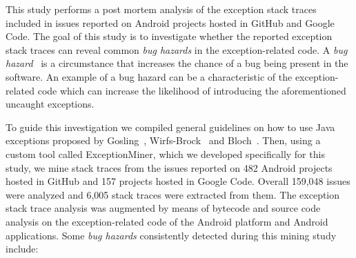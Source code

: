 \documentclass[conference]{IEEEtran}
\begin{document}

This study performs a post mortem analysis of the exception stack traces 
included in issues
reported on Android projects hosted in GitHub and Google Code. 
The goal of this study is to investigate whether the reported exception stack traces
 can reveal common \emph{bug hazards} in the exception-related code.  
A \emph{bug hazard}~\cite{binder2000testing}  is a circumstance that increases the 
chance of a bug being present in the software. An example of a bug hazard can 
be a characteristic of  the exception-related code which can increase the likelihood 
of introducing the aforementioned uncaught exceptions.

To guide this investigation we compiled general guidelines on how to use Java
exceptions proposed by Gosling~\cite{gosling2000java},
Wirfs-Brock~\cite{wirfs2006toward} and Bloch~\cite{bloch2008effective}.
Then, using a custom tool called ExceptionMiner,
 which we developed specifically for this study, we mine stack traces from the issues reported 
on 482 Android projects hosted in GitHub and 157 projects hosted in Google Code.
Overall 159,048 issues were analyzed and 6,005 stack traces were extracted from them.
The exception stack trace analysis was augmented by means of bytecode 
and source code analysis on the exception-related code of the Android 
platform and Android applications. Some \emph{bug hazards} consistently detected 
during this mining study include:
\end{document}
